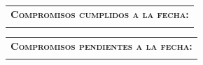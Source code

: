 \documentclass[12pt]{report}
\begin{document}
\vspace{0.3 cm}

\begin{minipage}{\textwidth}
	\begin{tabular}{l}
		\begin{minipage}[t]{\textwidth}%
			\cellcolor{blue!10}\textsc{\textbf{Compromisos cumplidos a la fecha:}}
		\end{minipage}
		\vspace{0.1cm}\\
		\begin{minipage}[t]{\textwidth}%
			\cellcolor{white!10}{\commitments}
		\end{minipage}
	\end{tabular}	
\end{minipage}

\vspace{0.3 cm}

\begin{minipage}{\textwidth}
	\begin{tabular}{l}
		\begin{minipage}[t]{\textwidth}%
			\cellcolor{blue!10}\textsc{\textbf{Compromisos pendientes a la fecha:}}
		\end{minipage}
		\vspace{0.1cm}\\
		\begin{minipage}[t]{\textwidth}%
			\cellcolor{white!10}{\todo}
		\end{minipage}
	\end{tabular}	
\end{minipage}
\end{document}
